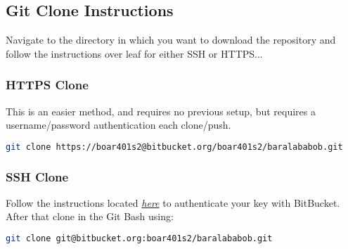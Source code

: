 			\subsection{Git Clone Instructions}
				Navigate to the directory in which you want to download the repository and follow the instructions over leaf for either SSH or HTTPS...
				\pagebreak
	
				\subsubsection{HTTPS Clone}
				This is an easier method, and requires no previous setup, but requires a username/password authentication each clone/push.\\
		
					\begin{lstlisting}[language=bash,caption={HTTPS Clone}]
git clone https://boar401s2@bitbucket.org/boar401s2/baralababob.git
					\end{lstlisting}
		
				\subsubsection{SSH Clone}
				Follow the instructions located \emph{\href{https://confluence.atlassian.com/display/BITBUCKET/Set+up+SSH+for+Git}{here}} to authenticate your key with BitBucket. After that clone in the Git Bash using:\\
				
					\begin{lstlisting}[language=bash,caption={SSH Clone}]
git clone git@bitbucket.org:boar401s2/baralababob.git
					\end{lstlisting}
					\pagebreak